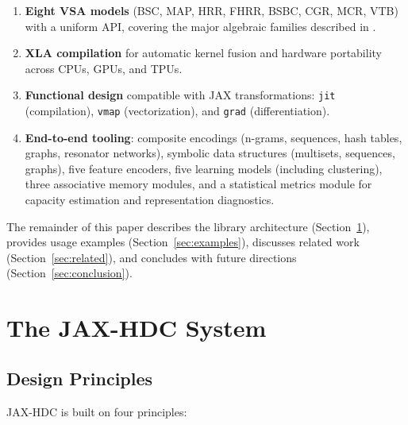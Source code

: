 \documentclass[twoside,11pt]{article}
\begin{document}
\begin{enumerate}
\item \textbf{Eight VSA models} (BSC, MAP, HRR, FHRR, BSBC, CGR, MCR, VTB) with a uniform API, covering the major algebraic families described in \citet{kleyko2022survey1}.

\item \textbf{XLA compilation} for automatic kernel fusion and hardware portability across CPUs, GPUs, and TPUs.

\item \textbf{Functional design} compatible with JAX transformations: \texttt{jit} (compilation), \texttt{vmap} (vectorization), and \texttt{grad} (differentiation).

\item \textbf{End-to-end tooling}: composite encodings (n-grams, sequences, hash tables, graphs, resonator networks), symbolic data structures (multisets, sequences, graphs), five feature encoders, five learning models (including clustering), three associative memory modules, and a statistical metrics module for capacity estimation and representation diagnostics.
\end{enumerate}

The remainder of this paper describes the library architecture (Section~\ref{sec:system}), provides usage examples (Section~\ref{sec:examples}), discusses related work (Section~\ref{sec:related}), and concludes with future directions (Section~\ref{sec:conclusion}).

\section{The JAX-HDC System}
\label{sec:system}

\subsection{Design Principles}

JAX-HDC is built on four principles:
\end{document}
